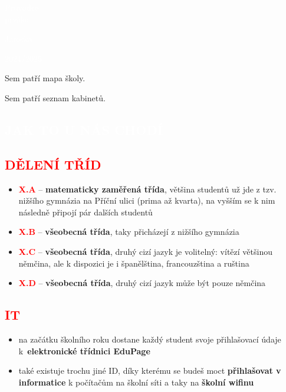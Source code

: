 \documentclass{article}
\newcommand{\nadpis}[1]{
  \vspace*{-60pt}
  \begin{nadpisbox}
    \vspace*{20pt}
    \centering \section*{\textcolor{white}{#1}}
  \end{nadpisbox}
}
\newcommand{\podnadpis}[1]{
  \subsection*{\textcolor{red}{#1}}
}
\begin{document}
\begin{titlepage}
  \pagecolor{red}
    \begin{center}
      \vspace*{\fill}

      \textcolor{white}{\fontsize{60}{60} \Kapitan Průvodce\\\vspace{0.2em}prváka}

      \vspace*{\fill}
      \textcolor{white}{\fontsize{20}{20} \Kapitan Jaroška}

      \vspace{0.5em}

      \begin{bluebox}
        \centering \fontsize{15}{15} \Kapitan \textcolor{white}{2024/2025}
      \end{bluebox}

      \vspace{3em}

    \end{center}
\end{titlepage}
\pagecolor{white}


Sem patří mapa školy.
\newpage

Sem patří seznam kabinetů.
\newpage

\nadpis{JAK TO U NÁS CHODÍ}
\noindent \podnadpis{DĚLENÍ TŘÍD}
\begin{itemize}[leftmargin=10pt]
  \item \textcolor{red}{\textbf{X.A}} --  \textbf{matematicky zaměřená třída}, většina studentů už jde z tzv. nižšího gymnázia na Příční ulici (prima až kvarta), na vyšším se k nim následně připojí pár dalších studentů
  \item \textcolor{red}{\textbf{X.B}} -- \textbf{všeobecná třída}, taky přicházejí z nižšího gymnázia
  \item \textcolor{red}{\textbf{X.C}} -- \textbf{všeobecná třída}, druhý cizí jazyk je volitelný: vítězí většinou němčina, ale
k dispozici je i španělština, francouzština a ruština
  \item \textcolor{red}{\textbf{X.D}} -- \textbf{všeobecná třída}, druhý cizí jazyk může být pouze němčina
\end{itemize}
\podnadpis{IT}
\begin{itemize}[leftmargin=10pt]
  \item na začátku školního roku dostane každý student svoje přihlašovací údaje k~\textbf{elektronické třídnici EduPage}
  \item také existuje trochu jiné ID, díky kterému se budeš moct \textbf{přihlašovat v informatice} k počítačům na školní síti a taky na \textbf{školní wifinu}
\end{itemize}
\end{document}
